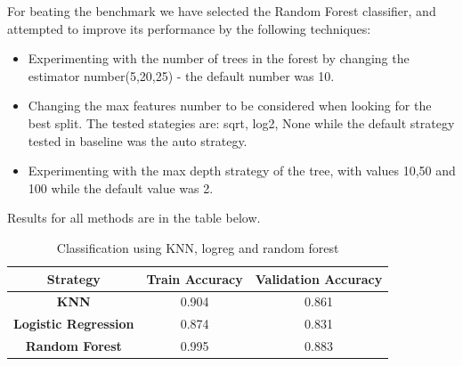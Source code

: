 \documentclass[12pt]{article}
\begin{document}
  For beating the benchmark we have selected the Random Forest classifier, and attempted to improve its performance by the following techniques:
	\begin{itemize}
		\item Experimenting with the number of trees in the forest by changing the estimator number(5,20,25) - the default number was 10.
		\item Changing the max features number to be considered when looking for the best split. The tested stategies are: sqrt, log2, None while the default strategy tested in baseline was the auto strategy.
		\item Experimenting with the max depth strategy of the tree, with values 10,50 and 100 while the default value was 2.
	\end{itemize}

  Results for all methods are in the table below.
 
 \begin{table}[H]
 	\centering
 	\begin{tabular}{|c|c|c|}
 		\hline
 		\textbf{Strategy}            & \textbf{Train Accuracy} & \textbf{Validation Accuracy} \\ \hline
 		\textbf{KNN}                 & 0.904                   & 0.861                        \\ \hline
 		\textbf{Logistic Regression} & 0.874                   & 0.831                        \\ \hline
 		\textbf{Random Forest}       & 0.995                   & 0.883                        \\ \hline
 	\end{tabular}
 \caption{Classification using KNN, logreg and random forest}
 \label{class}
 \end{table}
\end{document}
